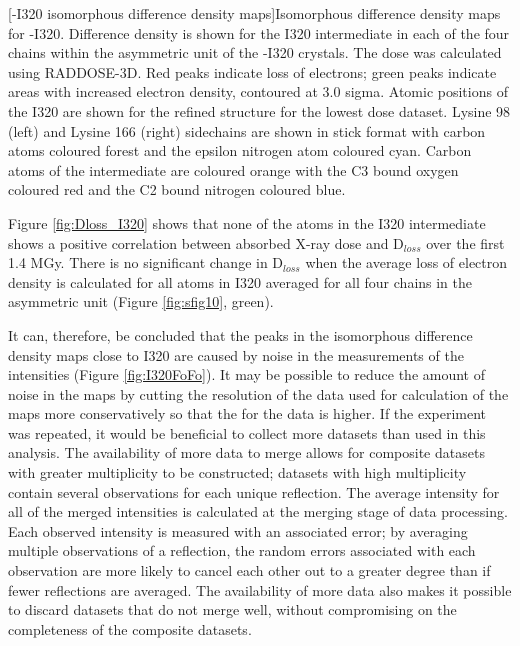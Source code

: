 \begin{minipage}{\linewidth}
	[\atpdx -I320 isomorphous difference density maps]{Isomorphous difference density maps for \atpdx-I320. Difference density is shown for the I320 intermediate in each of the four chains within the asymmetric unit of the \atpdx-I320 crystals. The dose was calculated using RADDOSE-3D. Red peaks indicate loss of electrons; green peaks indicate areas with increased electron density, contoured at 3.0 sigma. Atomic positions of the I320 are shown for the refined structure for the lowest dose dataset. Lysine 98 (left) and Lysine 166 (right) sidechains are shown in stick format with carbon atoms coloured forest and the epsilon nitrogen atom coloured cyan. Carbon atoms of the intermediate are coloured orange with the C3 bound oxygen coloured red and the C2 bound nitrogen coloured blue. \label{fig:I320FoFo}}		
\end{minipage}

Figure \ref{fig:Dloss_I320} shows that none of the atoms in the I320 intermediate shows a positive correlation between absorbed X-ray dose and D$_{loss}$ over the first 1.4 \si{\mega\gray}. There is no significant change in D$_{loss}$ when the average loss of electron density is calculated for all atoms in I320 averaged for all four chains in the asymmetric unit (Figure \ref{fig:sfig10}, green).

It can, therefore, be concluded that the peaks in the isomorphous difference density maps close to I320 are caused by noise in the measurements of the intensities (Figure \ref{fig:I320FoFo}). It may be possible to reduce the amount of noise in the maps by cutting the resolution of the data used for calculation of the maps more conservatively so that the  for the data is higher. If the experiment was repeated, it would be beneficial to collect more datasets than used in this analysis. The availability of more data to merge allows for composite datasets with greater multiplicity to be constructed; datasets with high multiplicity contain several observations for each unique reflection. The average intensity for all of the merged intensities is calculated at the merging stage of data processing. Each observed intensity is measured with an associated error; by averaging multiple observations of a reflection, the random errors associated with each observation are more likely to cancel each other out to a greater degree than if fewer reflections are averaged. The availability of more data also makes it possible to discard datasets that do not merge well, without compromising on the completeness of the composite datasets.     

